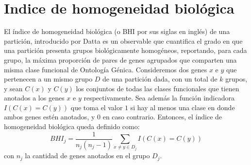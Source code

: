 \section{Indice de homogeneidad biológica}
El índice de homogeneidad biológica (o BHI por sus siglas en inglés) de una partición, introducido por Datta \cite{Datta2006} es un observable que cuantifica el grado en que una partición presenta grupos biológicamente homogéneos, reportando, para cada grupo, la máxima proporción de pares de genes agrupados que comparten una misma clase funcional de Ontología Génica. Consideremos dos genes $x$ e $y$ que pertenecen a un mismo grupo $D$ de una partición dada, con un total de $k$ grupos, y sean $C(x)$ y $C(y)$ los conjuntos de todas las clases funcionales que tienen anotados a los genes $x$ e $y$ respectivamente. Sea además la función indicadora $I(C(x)=C(y))$ que toma el valor $1$ si hay al menos una clase en donde ambos genes estén anotados, y $0$ en caso contrario. Entonces, el índice de homogeneidad biológica queda definido como:
\begin{equation}
	BHI_j = \frac{1}{n_j(n_j-1)}\sum\limits_{x\neq y\in D_j}I(C(x)=C(y))
\end{equation}
con $n_j$ la cantidad de genes anotados en el grupo $D_j$.\\\\

